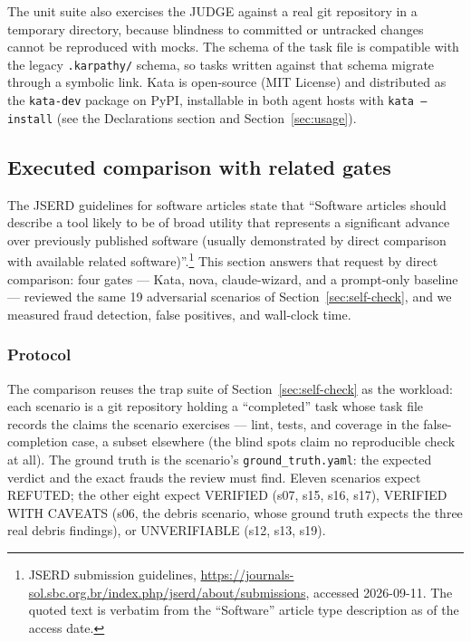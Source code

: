 \documentclass{sbc2019}%
\begin{document}
The unit suite also exercises the JUDGE against a real git repository in a
temporary directory, because blindness to committed or untracked changes
cannot be reproduced with mocks. The schema of the task file is compatible
with the legacy \texttt{.karpathy/} schema, so tasks written against that
schema migrate through a symbolic link. Kata is open-source (MIT License)
and distributed as the \texttt{kata-dev} package on PyPI, installable in
both agent hosts with \texttt{kata --install} (see the Declarations
section and Section~\ref{sec:usage}).

\subsection{Executed comparison with related gates}
\label{sec:exec-comparison}

The JSERD guidelines for software articles state that ``Software articles
should describe a tool likely to be of broad utility that represents a
significant advance over previously published software (usually demonstrated
by direct comparison with available related software)''.\footnote{JSERD
submission guidelines,
\url{https://journals-sol.sbc.org.br/index.php/jserd/about/submissions},
accessed 2026-09-11. The quoted text is verbatim from the ``Software''
article type description as of the access date.} This
section answers that request by direct comparison: four gates --- Kata, nova, claude-wizard,
and a prompt-only baseline --- reviewed the same 19 adversarial scenarios of
Section~\ref{sec:self-check}, and we measured fraud detection, false positives,
and wall-clock time.

\subsubsection{Protocol}

The comparison reuses the trap suite of Section~\ref{sec:self-check} as the
workload: each scenario is a git repository holding a ``completed'' task
whose task file records the claims the scenario exercises --- lint, tests,
and coverage in the false-completion case, a subset elsewhere (the blind
spots claim no reproducible check at all). The ground truth is
the scenario's \texttt{ground\_truth.yaml}: the expected verdict and the
exact frauds the review must find. Eleven scenarios expect REFUTED; the
other eight expect VERIFIED (s07, s15, s16, s17), VERIFIED WITH CAVEATS
(s06, the debris scenario, whose ground truth expects the three real debris
findings), or UNVERIFIABLE (s12, s13, s19).
\end{document}
